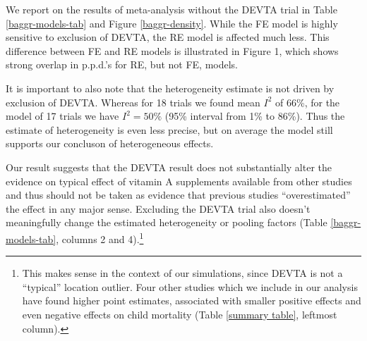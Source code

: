 \documentclass[12pt]{article}
\begin{document}
We report on the results of meta-analysis without the DEVTA trial in Table \ref{baggr-models-tab} and Figure \ref{baggr-density}. While the FE model is highly sensitive to exclusion of DEVTA, the RE model is affected much less. This difference between FE and RE models is illustrated in Figure 1, which shows strong overlap in p.p.d.'s for RE, but not FE, models.

It is important to also note that the heterogeneity estimate is not driven by exclusion of DEVTA. Whereas for 18 trials we found mean $I^2$ of 66\%, for the model of 17 trials we have $I^2 = 50\%$ (95\% interval from 1\% to 86\%). Thus the estimate of heterogeneity is even less precise, but on average the model still supports our concluson of heterogeneous effects.

Our result suggests that the DEVTA result does not substantially alter the evidence on typical effect of vitamin A supplements available from other studies and thus should not be taken as evidence that previous studies ``overestimated'' the effect in any major sense. Excluding the DEVTA trial also doesn't meaningfully change the estimated heterogeneity or pooling factors (Table \ref{baggr-models-tab}, columns 2 and 4).\footnote{This makes sense in the context of our simulations, since DEVTA is not a ``typical'' location outlier. Four other studies which we include in our analysis have found higher point estimates, associated with smaller positive effects and even negative effects on child mortality (Table \ref{summary table}, leftmost column).}


\end{document}
